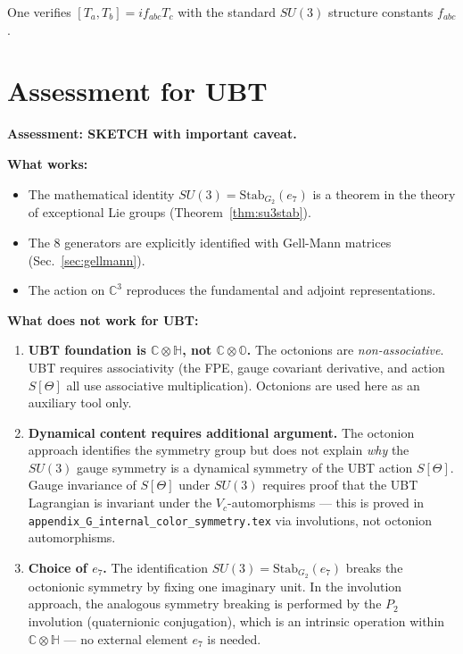 \documentclass[12pt,a4paper]{article}
\theoremstyle{definition}
\theoremstyle{remark}
\begin{document}
One verifies $[T_a, T_b] = if_{abc}T_c$ with the standard $SU(3)$
structure constants $f_{abc}$.

\section{Assessment for UBT}
\label{sec:assessment}

\begin{gapbox}
\textbf{Assessment: SKETCH with important caveat.}

\textbf{What works:}
\begin{itemize}
  \item The mathematical identity $SU(3) = \mathrm{Stab}_{G_2}(e_7)$ is a
        theorem in the theory of exceptional Lie groups (Theorem~\ref{thm:su3stab}).
  \item The 8 generators are explicitly identified with Gell-Mann matrices
        (Sec.~\ref{sec:gellmann}).
  \item The action on $\mathbb{C}^3$ reproduces the fundamental and adjoint
        representations.
\end{itemize}

\textbf{What does not work for UBT:}
\begin{enumerate}
  \item \textbf{UBT foundation is $\mathbb{C}\otimes\mathbb{H}$, not $\mathbb{C}\otimes\mathbb{O}$.}
    The octonions are \emph{non-associative}.  UBT requires associativity
    (the FPE, gauge covariant derivative, and action $S[\Theta]$ all use
    associative multiplication).  Octonions are used here as an auxiliary
    tool only.

  \item \textbf{Dynamical content requires additional argument.}
    The octonion approach identifies the symmetry group but does not explain
    \emph{why} the $SU(3)$ gauge symmetry is a dynamical symmetry of the UBT
    action $S[\Theta]$.  Gauge invariance of $S[\Theta]$ under $SU(3)$
    requires proof that the UBT Lagrangian is invariant under the
    $V_c$-automorphisms --- this is proved in
    \texttt{appendix\_G\_internal\_color\_symmetry.tex} via involutions,
    not octonion automorphisms.

  \item \textbf{Choice of $e_7$.}
    The identification $SU(3) = \mathrm{Stab}_{G_2}(e_7)$ breaks the
    octonionic symmetry by fixing one imaginary unit.  In the involution
    approach, the analogous symmetry breaking is performed by the $P_2$
    involution (quaternionic conjugation), which is an intrinsic operation
    within $\mathbb{C}\otimes\mathbb{H}$ --- no external element $e_7$
    is needed.
\end{enumerate}


\end{gapbox}
\end{document}
